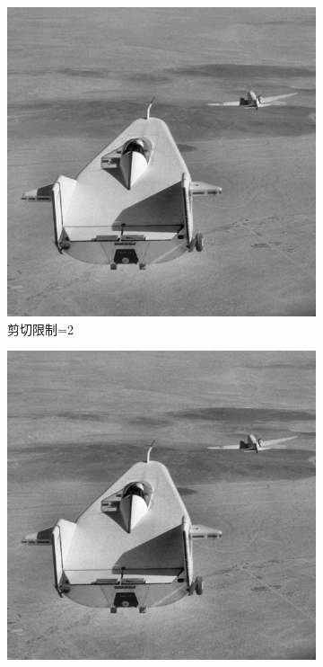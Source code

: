 \documentclass[a4paper]{ctexart}
\newcommand{\outwfour}{0.23\textwidth}
\begin{document}
\begin{spacing}{1.35}
	\begin{figure}[htbp]
		\centering
		\begin{subfigure}[t]{\outwfour}
			\centering
			\includegraphics[width=\textwidth]{figure/1_clip_limit_2.png}
			\caption{剪切限制=2}
		\end{subfigure}
		\begin{subfigure}[t]{\outwfour}
			\centering
			\includegraphics[width=\textwidth]{figure/1_clip_limit_3.png}

\end{subfigure}
\end{figure}
\end{spacing}
\end{document}
